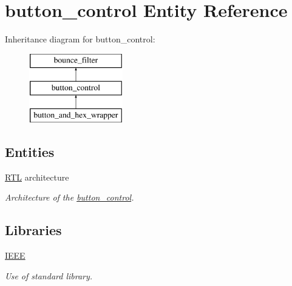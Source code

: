 \hypertarget{classbutton__control}{\section{button\-\_\-control Entity Reference}
\label{classbutton__control}
}
Inheritance diagram for button\-\_\-control\-:\begin{figure}[H]
\begin{center}
\leavevmode
\includegraphics[height=3.000000cm]{classbutton__control}
\end{center}
\end{figure}
\subsection*{Entities}
\begin{DoxyCompactItemize}
\item 
\hyperlink{classbutton__control_1_1RTL}{R\-T\-L} architecture
\begin{DoxyCompactList}\small\item\em Architecture of the \hyperlink{classbutton__control}{button\-\_\-control}. \end{DoxyCompactList}\end{DoxyCompactItemize}
\subsection*{Libraries}
 \begin{DoxyCompactItemize}
\item 
\hypertarget{classbutton__control_ae4f03c286607f3181e16b9aa12d0c6d4}{\hyperlink{classbutton__control_ae4f03c286607f3181e16b9aa12d0c6d4}{I\-E\-E\-E} }\label{classbutton__control_ae4f03c286607f3181e16b9aa12d0c6d4}

\begin{DoxyCompactList}\small\item\em Use of standard library. \end{DoxyCompactList}\end{DoxyCompactItemize}
